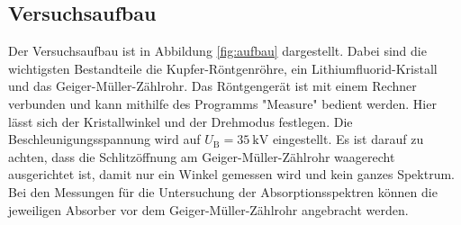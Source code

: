 \subsection{Versuchsaufbau}
\label{sec:Versuchsaufbau}
Der Versuchsaufbau ist in Abbildung \ref{fig:aufbau} dargestellt.
Dabei sind die wichtigsten Bestandteile die Kupfer-Röntgenröhre, ein Lithiumfluorid-Kristall
und das Geiger-Müller-Zählrohr.
Das Röntgengerät ist mit einem Rechner verbunden und kann mithilfe des Programms "Measure"
bedient werden. 
Hier lässt sich der Kristallwinkel und der Drehmodus festlegen.
Die Beschleunigungsspannung wird auf $U_{\mathrm{B}}=\SI{35}{\kilo\volt}$ eingestellt.
Es ist darauf zu achten, dass die Schlitzöffnung am Geiger-Müller-Zählrohr waagerecht 
ausgerichtet ist, damit nur ein Winkel gemessen wird und kein ganzes Spektrum.
Bei den Messungen für die Untersuchung der Absorptionsspektren können die jeweiligen Absorber
vor dem Geiger-Müller-Zählrohr angebracht werden.
